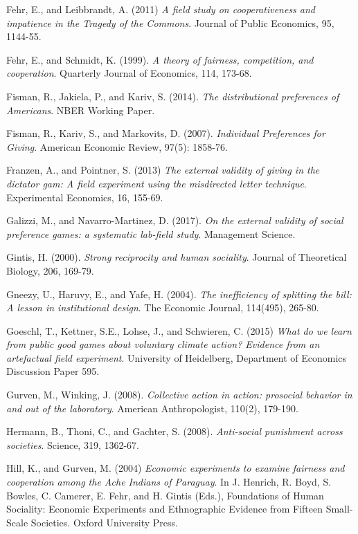 \documentclass{article}
\begin{document}
\begin{thebibliography}{9}
Fehr, E., and Leibbrandt, A. (2011)
\textit{A field study on cooperativeness and impatience in the Tragedy of the Commons}.
Journal of Public Economics, 95, 1144-55.

Fehr, E., and Schmidt, K. (1999).
\textit{A theory of fairness, competition, and cooperation}.
Quarterly Journal of Economics, 114, 173-68.

Fisman, R., Jakiela, P., and Kariv, S. (2014).
\textit{The distributional preferences of Americans}.
NBER Working Paper.

Fisman, R., Kariv, S., and Markovits, D. (2007).
\textit{Individual Preferences for Giving}.
American Economic Review, 97(5): 1858-76.

Franzen, A., and Pointner, S. (2013)
\textit{The external validity of giving in the dictator gam: A field experiment using the misdirected letter technique}.
Experimental Economics, 16, 155-69.

Galizzi, M., and Navarro-Martinez, D. (2017).
\textit{On the external validity of social preference games: a systematic lab-field study}.
Management Science.

Gintis, H. (2000).
\textit{Strong reciprocity and human sociality}.
Journal of Theoretical Biology, 206, 169-79.

Gneezy, U., Haruvy, E., and Yafe, H. (2004).
\textit{The inefficiency of splitting the bill: A lesson in institutional design}.
The Economic Journal, 114(495), 265-80.

Goeschl, T., Kettner, S.E., Lohse, J., and Schwieren, C. (2015)
\textit{What do we learn from public good games about voluntary climate action? Evidence from an artefactual field experiment}.
University of Heidelberg, Department of Economics Discussion Paper 595.

Gurven, M., Winking, J. (2008).
\textit{Collective action in action: prosocial behavior in and out of the laboratory}.
American Anthropologist, 110(2), 179-190. 

Hermann, B., Thoni, C., and Gachter, S. (2008).
\textit{Anti-social punishment across societies}.
Science, 319, 1362-67.

Hill, K., and Gurven, M. (2004)
\textit{Economic experiments to examine fairness and cooperation among the Ache Indians of Paraguay}.
In J. Henrich, R. Boyd, S. Bowles, C. Camerer, E. Fehr, and H. Gintis (Eds.),
Foundations of Human Sociality: Economic Experiments and Ethnographic Evidence from Fifteen Small-Scale Societies. Oxford University Press.


\end{thebibliography}
\end{document}
